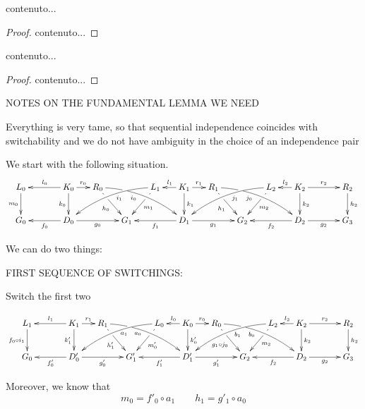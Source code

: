 \documentclass[a4paper,UKenglish,cleveref,pdftex, thm-restate,numberwithinsect]{lipics}
\begin{document}
\begin{corollary}
	contenuto...
\end{corollary}
\begin{proof}
	contenuto...
\end{proof}


\begin{corollary}
	contenuto...
\end{corollary}
\begin{proof}
	contenuto...
\end{proof}
\newpage


NOTES ON THE FUNDAMENTAL LEMMA WE NEED

Everything is very tame, so that sequential independence coincides with switchability and we do not have ambiguity in the choice of an independence pair


We start with the following situation.
	\[\xymatrix@C=15pt{L_0\ar[d]_{m_0}&& K_0 \ar[d]_{k_0}\ar[ll]_{l_0} \ar[r]^{r_0} & R_0 \ar@/^.35cm/[drrr]_(.4){i_0}|(.285)\hole \ar[dr]|(.28)\hole_{h_0} && L_1 \ar@/_.35cm/[dlll]^(.4){i_1} \ar[dl]|(.28)\hole^{m_1}& K_1 \ar[d]^{k_1}\ar[l]_{l_1} \ar[r]^{r_1} & R_1 \ar[dr]|(.28)\hole_{h_1} \ar@/^.35cm/[drrr]_(.4){j_0}|(.285)\hole  && L_2 \ar@/_.35cm/[dlll]^(.4){j_1} \ar[dl]|(.28)\hole^{m_2}& K_2 \ar[d]^{k_2}\ar[l]_{l_2} \ar[rr]^{r_2} && R_2 \ar[d]^{h_2} \\G_0 && \ar[ll]^{f_0} D_0 \ar[rr]_{g_0}&& G_1  && \ar[ll]^{f_1} D_1 \ar[rr]_{g_1}&& G_2 && \ar[ll]^{f_2} D_2 \ar[rr]_{g_2}&& G_3 }\]
	
	We can do two things:
	
	FIRST SEQUENCE OF SWITCHINGS:
	
	Switch the first two
	

	\[\xymatrix@C=15pt{L_1\ar[d]_{f_0\circ i_1}&& K_1 \ar[d]_{k'_1}\ar[ll]_{l_1} \ar[r]^{r_1} & R_1 \ar@/^.35cm/[drrr]_(.4){a_0}|(.285)\hole \ar[dr]|(.28)\hole_{h'_1} && L_0 \ar@/_.35cm/[dlll]^(.4){a_1} \ar[dl]|(.28)\hole^{m'_0}& K_0 \ar[d]^{k'_0}\ar[l]_{l_0} \ar[r]^{r_0} & R_0 \ar[dr]|(.28)\hole_{g_1\circ j_0} \ar@/^.35cm/[drrr]_(.4){b_0}|(.285)\hole  && L_2 \ar@/_.35cm/[dlll]^(.4){b_1} \ar[dl]|(.28)\hole^{m_2}& K_2 \ar[d]^{k_2}\ar[l]_{l_2} \ar[rr]^{r_2} && R_2 \ar[d]^{h_2} \\G_0 && \ar[ll]^{f'_0} D'_0 \ar[rr]_{g'_0}&& G'_1  && \ar[ll]^{f'_1} D'_1 \ar[rr]_{g'_1}&& G_2 && \ar[ll]^{f_2} D_2 \ar[rr]_{g_2}&& G_3 }\]
	
	Moreover, we know that
	\[m_0=f'_0\circ a_1 \qquad h_1=g'_1\circ a_0\]
	
\end{document}
